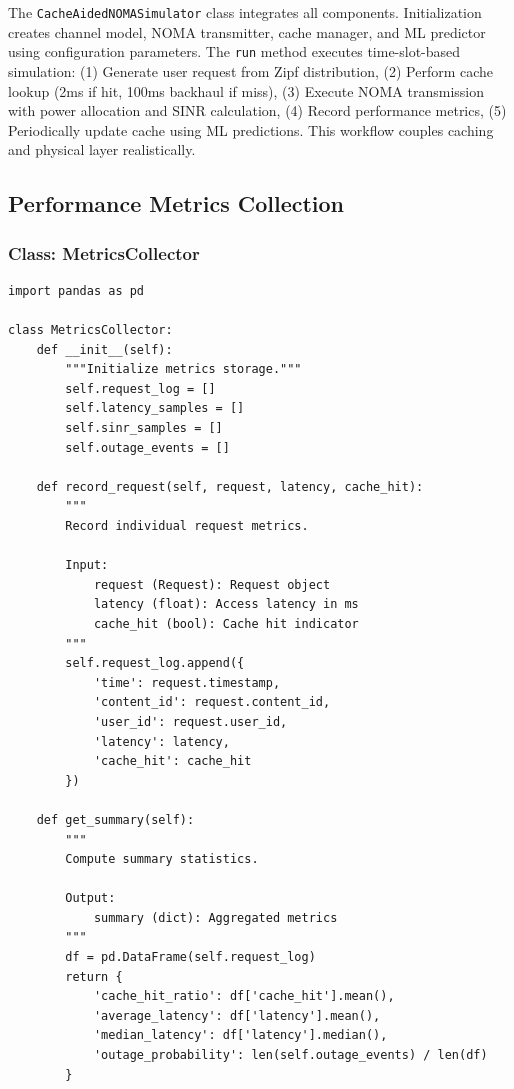 \documentclass[12pt,a4paper]{article}
\begin{document}
The \texttt{CacheAidedNOMASimulator} class integrates all components. Initialization creates channel model, NOMA transmitter, cache manager, and ML predictor using configuration parameters. The \texttt{run} method executes time-slot-based simulation: (1) Generate user request from Zipf distribution, (2) Perform cache lookup (2ms if hit, 100ms backhaul if miss), (3) Execute NOMA transmission with power allocation and SINR calculation, (4) Record performance metrics, (5) Periodically update cache using ML predictions. This workflow couples caching and physical layer realistically.

\subsection{Performance Metrics Collection}

\subsubsection{Class: MetricsCollector}

\begin{verbatim}
import pandas as pd

class MetricsCollector:
    def __init__(self):
        """Initialize metrics storage."""
        self.request_log = []
        self.latency_samples = []
        self.sinr_samples = []
        self.outage_events = []
    
    def record_request(self, request, latency, cache_hit):
        """
        Record individual request metrics.
        
        Input:
            request (Request): Request object
            latency (float): Access latency in ms
            cache_hit (bool): Cache hit indicator
        """
        self.request_log.append({
            'time': request.timestamp,
            'content_id': request.content_id,
            'user_id': request.user_id,
            'latency': latency,
            'cache_hit': cache_hit
        })
    
    def get_summary(self):
        """
        Compute summary statistics.
        
        Output:
            summary (dict): Aggregated metrics
        """
        df = pd.DataFrame(self.request_log)
        return {
            'cache_hit_ratio': df['cache_hit'].mean(),
            'average_latency': df['latency'].mean(),
            'median_latency': df['latency'].median(),
            'outage_probability': len(self.outage_events) / len(df)
        }
\end{verbatim}
\end{document}
